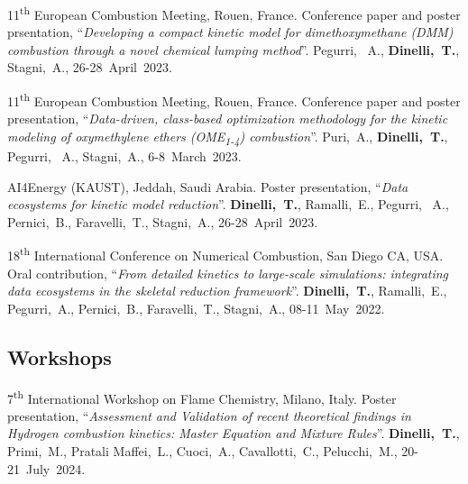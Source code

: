 \begin{etaremune}
    \item
    11\textsuperscript{th} European Combustion Meeting, Rouen, France. Conference paper
    and poster prsentation, ``{\it Developing a compact kinetic model for
    dimethoxymethane (DMM) combustion through a novel chemical lumping method}''.
    Pegurri, ~A., {\bf Dinelli,~T.}, Stagni,~A.,
    26-28~April~2023.

    \item
    11\textsuperscript{th} European Combustion Meeting, Rouen, France. Conference paper
    and poster presentation, ``{\it Data-driven, class-based optimization methodology
    for the kinetic modeling of oxymethylene ethers (OME\textsubscript{1-4}) combustion}''.
    Puri,~A., {\bf Dinelli,~T.}, Pegurri, ~A., Stagni,~A.,
    6-8~March~2023.

    \item
    AI4Energy (KAUST), Jeddah, Saudi Arabia. Poster presentation, ``{\it Data ecosystems for
    kinetic model reduction}''. {\bf Dinelli,~T.}, Ramalli,~E., Pegurri,
    ~A., Pernici,~B., Faravelli,~T., Stagni,~A.,
    26-28~April~2023.

    \item
    18\textsuperscript{th} International Conference on Numerical Combustion, San Diego
    CA, USA. Oral contribution, ``{\it From detailed kinetics to large-scale
    simulations: integrating data ecosystems in the skeletal reduction framework}''.
    {\bf Dinelli,~T.}, Ramalli,~E., Pegurri,~A., Pernici,~B.,
    Faravelli,~T., Stagni,~A.,
    08-11~May~2022.
\end{etaremune}

\subsection{Workshops}
\begin{etaremune}
    \item
    7\textsuperscript{th} International Workshop on Flame Chemistry, Milano, Italy.
    Poster presentation, ``{\it Assessment and Validation of recent theoretical
    findings in Hydrogen combustion kinetics: Master Equation and Mixture Rules}''.
    {\bf Dinelli,~T.}, Primi,~M., Pratali Maffei,~L., Cuoci,~A.,
    Cavallotti,~C., Pelucchi,~M.,
    20-21~July~2024.
\end{etaremune}

